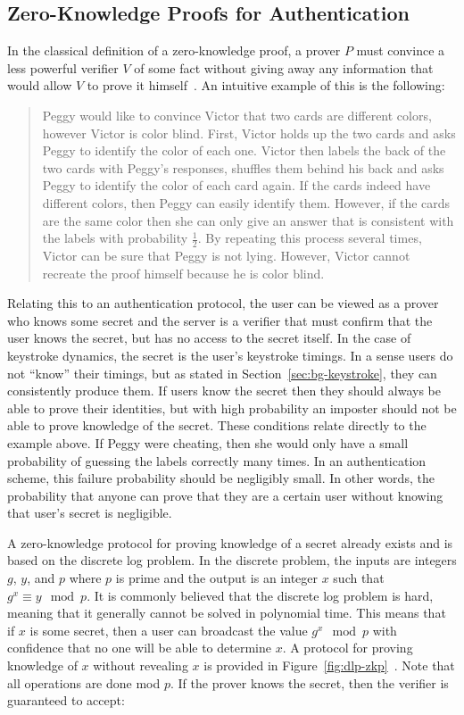 \documentclass[11pt]{article}
\begin{document}
\subsection{Zero-Knowledge Proofs for Authentication}
\label{sec:bg-zkp}
In the classical definition of a zero-knowledge proof, a prover $P$ must convince a less powerful verifier $V$ of some fact without giving away any information that would allow $V$ to prove it himself~\cite{GMW86}. An intuitive example of this is the following:

\begin{quote}\small
Peggy would like to convince Victor that two cards are different colors, however Victor is color blind. First, Victor holds up the two cards and asks Peggy to identify the color of each one. Victor then labels the back of the two cards with Peggy's responses, shuffles them behind his back and asks Peggy to identify the color of each card again. If the cards indeed have different colors, then Peggy can easily identify them. However, if the cards are the same color then she can only give an answer that is consistent with the labels with probability $\frac12$. By repeating this process several times, Victor can be sure that Peggy is not lying. However, Victor cannot recreate the proof himself because he is color blind.
\end{quote}

\noindent Relating this to an authentication protocol, the user can be viewed as a prover who knows some secret and the server is a verifier that must confirm that the user knows the secret, but has no access to the secret itself. In the case of keystroke dynamics, the secret is the user's keystroke timings. In a sense users do not ``know'' their timings, but as stated in Section~\ref{sec:bg-keystroke}, they can consistently produce them. If users know the secret then they should always be able to prove their identities, but with high probability an imposter should not be able to prove knowledge of the secret. These conditions relate directly to the example above. If Peggy were cheating, then she would only have a small probability of guessing the labels correctly many times. In an authentication scheme, this failure probability should be negligibly small. In other words, the probability that anyone can prove that they are a certain user without knowing that user's secret is negligible.

A zero-knowledge protocol for proving knowledge of a secret already exists and is based on the discrete log problem. In the discrete problem, the inputs are integers $g$, $y$, and $p$ where $p$ is prime and the output is an integer $x$ such that $g^x\equiv y\mod p$. It is commonly believed that the discrete log problem is hard, meaning that it generally cannot be solved in polynomial time. This means that if $x$ is some secret, then a user can broadcast the value $g^x\mod p$ with confidence that no one will be able to determine $x$. A protocol for proving knowledge of $x$ without revealing $x$ is provided in Figure~\ref{fig:dlp-zkp}~\cite{crypto-1986-1125}. Note that all operations are done mod $p$. If the prover knows the secret, then the verifier is guaranteed to accept:
\end{document}
